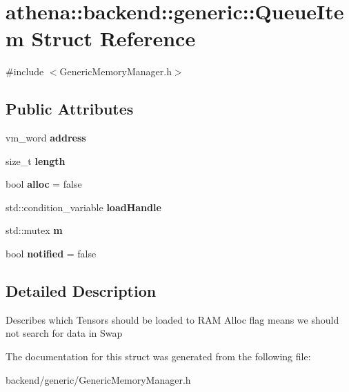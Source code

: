 \hypertarget{structathena_1_1backend_1_1generic_1_1_queue_item}{}\section{athena\+:\+:backend\+:\+:generic\+:\+:Queue\+Item Struct Reference}
\label{structathena_1_1backend_1_1generic_1_1_queue_item}


{\ttfamily \#include $<$Generic\+Memory\+Manager.\+h$>$}

\subsection*{Public Attributes}
\begin{DoxyCompactItemize}
\item 
\mbox{\label{structathena_1_1backend_1_1generic_1_1_queue_item_a9d1c0aa22d58d18392c2ae7bec943b07}} 
vm\+\_\+word {\bfseries address}
\item 
\mbox{\label{structathena_1_1backend_1_1generic_1_1_queue_item_a824170e499e70a8d2bd5c069579671a9}} 
size\+\_\+t {\bfseries length}
\item 
\mbox{\label{structathena_1_1backend_1_1generic_1_1_queue_item_aef5166382f4be9c116bc46e66556384a}} 
bool {\bfseries alloc} = false
\item 
\mbox{\label{structathena_1_1backend_1_1generic_1_1_queue_item_a563299ec884b7fea39492d0b8ba5d6d1}} 
std\+::condition\+\_\+variable {\bfseries load\+Handle}
\item 
\mbox{\label{structathena_1_1backend_1_1generic_1_1_queue_item_a5267156baa60e81c64521b81d803aa50}} 
std\+::mutex {\bfseries m}
\item 
\mbox{\label{structathena_1_1backend_1_1generic_1_1_queue_item_a3d4b8f15dfd8f58ac592988f00879e34}} 
bool {\bfseries notified} = false
\end{DoxyCompactItemize}


\subsection{Detailed Description}
Describes which Tensors should be loaded to R\+AM Alloc flag means we should not search for data in Swap 

The documentation for this struct was generated from the following file\+:\begin{DoxyCompactItemize}
\item 
backend/generic/Generic\+Memory\+Manager.\+h\end{DoxyCompactItemize}
